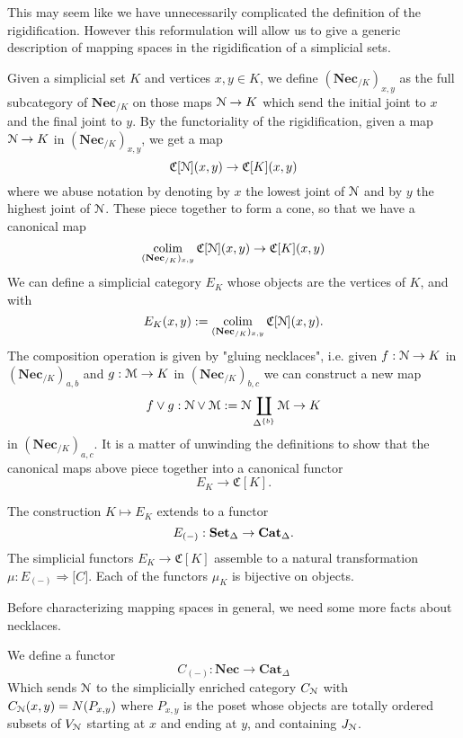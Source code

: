 This may seem like we have unnecessarily complicated the definition of the rigidification. However this reformulation will allow us to give a generic description of mapping spaces in the rigidification of a simplicial sets. 

Given a simplicial set $K$ and vertices $x,y\in K$, we define $(\mathbf{Nec}_{/K})_{x,y}$ as the full subcategory of $\mathbf{Nec}_{/K}$ on those maps $\EuScript{N}\to K$ which send the initial joint to $x$ and the final joint to $y$. By the functoriality of the rigidification, given a map $\EuScript{N}\to K$ in $(\mathbf{Nec}_{/K})_{x,y}$, we get a map 
\[
\mathfrak{C}[\EuScript{N}](x,y)\to \mathfrak{C}[K](x,y)
\] 
where we abuse notation by denoting by $x$ the lowest joint of $\EuScript{N}$ and by $y$ the highest joint of $\EuScript{N}$. These piece together to form a cone, so that we have a canonical map 
\[
\operatorname*{colim}_{(\mathbf{Nec}_{/K})_{x,y}}\mathfrak{C}[\EuScript{N}](x,y) \to \mathfrak{C}[K](x,y)
\] 
We can define a simplicial category $E_K$ whose objects are the vertices of $K$, and with 
\[
E_K(x,y):=\operatorname*{colim}_{(\mathbf{Nec}_{/K})_{x,y}}\mathfrak{C}[\EuScript{N}](x,y).
\]
The composition operation is given by "gluing necklaces", i.e. given $f:\EuScript{N}\to K$ in $(\mathbf{Nec}_{/K})_{a,b}$ and $g: \EuScript{M}\to K$ in $(\mathbf{Nec}_{/K})_{b,c}$ we can construct a new map 
\[
f\vee g: \EuScript{N}\vee \EuScript{M}:= \EuScript{N}\coprod_{\Delta^{\{b\}}} \EuScript{M} \to K
\]
in $(\mathbf{Nec}_{/K})_{a,c}$. It is a matter of unwinding the definitions to show that the canonical maps above piece together into a canonical functor
\[
E_K\to \mathfrak{C}[K].
\]
\begin{note}
	The construction $K\mapsto E_K$ extends to a functor
	\[
	E_{(-)}: \mathbf{Set}_\Delta\to \mathbf{Cat}_\Delta. 
	\]
	The  simplicial functors $E_K\to\mathfrak{C}[K]$ assemble to a natural transformation $\mu: E_{(-)}\Rightarrow \mathfrak[C]$. Each of the functors $\mu_K$ is bijective on objects.
\end{note}

Before characterizing mapping spaces in general, we need some more facts about necklaces. 
\begin{definition}
	We define a functor 
	\[
	C_{(-)}:\mathbf{Nec}\to \mathbf{Cat}_\Delta 
	\]
	Which sends $\EuScript{N}$ to the simplicially enriched category $C_{\EuScript{N}}$ with $C_{\EuScript{N}}(x,y)=N(P_{x,y})$
	where $P_{x,y}$ is the poset whose objects are totally ordered subsets of $V_{\EuScript{N}}$ starting at $x$ and ending at $y$, and containing $J_{\EuScript{N}}$.
\end{definition}


